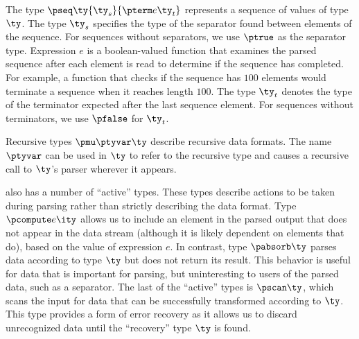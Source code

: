 The type $\pseq \ty {\ty_s} {\pterm e {\ty_t}}$ represents a sequence
of values of type $\ty$. The type $\ty_s$ specifies the type of
the separator found between elements of the sequence. For sequences
without separators, we use $\ptrue$ as the separator type. 
Expression $e$ is a boolean-valued function that examines the parsed
sequence after each element is read to determine
if the sequence has completed. For example, a function that
checks if the sequence has $100$ elements would
terminate a sequence when it reaches length $100$.  The type 
$\ty_t$ denotes the type of the terminator expected after the last sequence
element. For sequences without terminators, we use
$\pfalse$ for $\ty_t$.

Recursive types $\pmu \ptyvar \ty$ describe recursive data formats.
The name $\ptyvar$ can be used in $\ty$ to refer to the recursive type
and causes a recursive call to $\ty$'s parser wherever it appears.

\ddc{} also has a number of ``active'' types.
These types describe actions to be taken during parsing
rather than strictly describing the data format. Type $\pcompute e
\ity$ allows us to include an element in the parsed output that
does not appear in the data stream (although it is likely dependent on
elements that do), based on the value of expression $e$.  In
contrast, type $\pabsorb \ty$ parses data according to type $\ty$
but does not return its result. This behavior is useful for data
that is important for parsing, but
uninteresting to users of the parsed data, such as a separator. The last of the ``active''
types is $\pscan \ty$, which scans the input for 
data that can be successfully transformed according to $\ty$. This type provides a form of error recovery
as it allows us to discard unrecognized data until the ``recovery'' type $\ty$ is found.

